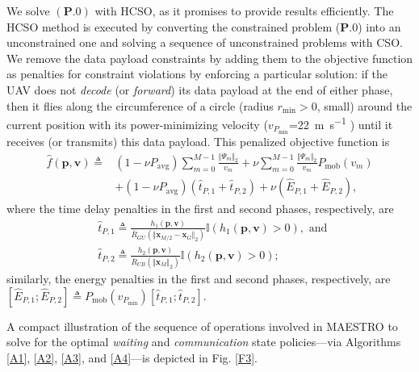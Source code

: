 \documentclass[12pt, draftcls, onecolumn]{IEEEtran}
\theoremstyle{plain}
\theoremstyle{definition}
\theoremstyle{remark}
\begin{document}
We solve $(\mathbf{P.0})$ with HCSO, as it promises to provide results efficiently. The HCSO method is executed by converting the constrained problem ($\mathbf{P.0}$) into an unconstrained one and solving a sequence of unconstrained problems with CSO. We remove the data payload constraints by adding them to the objective function as penalties for constraint violations by enforcing a particular solution: if the UAV does not \emph{decode} (or \emph{forward}) its data payload at the end of either phase, then it flies along the circumference of a circle (radius $r_{\mathrm{min}}{>}0$, small) around the current position with its power-minimizing velocity ($v_{P_{\mathrm{min}}}$=\qty[mode=text]{22}{\meter\per\second} \cite{SCA}) until it receives (or transmits) this data payload. This penalized objective function is
\begin{align}\label{eq:Fhat}
    \hat{f}(\mathbf{p},\mathbf v) \triangleq &(1-\nu P_{\mathrm{avg}}) \sum_{m=0}^{M-1} \frac{\Vert \Psi_m \Vert_2}{v_m} + \nu \sum_{m=0}^{M-1} \frac{\Vert \Psi_m \Vert_2}{v_m} P_{\mathrm{mob}}(v_m) \\
    &+ (1-\nu P_{\mathrm{avg}})(\hat{t}_{P,1} + \hat{t}_{P,2}) + \nu(\hat{E}_{P,1} + \hat{E}_{P,2})\nonumber,
\end{align}
where the time delay penalties in the first and second phases, respectively, are
\begin{align}
    &\hat{t}_{P,1} \triangleq \frac{h_{1}(\mathbf p,\mathbf v)}{\bar R_{GU}\left(\Vert\mathbf x_{M/2}-\mathbf x_{G}\Vert_2 \right)} \mathbb{I}\left( h_1 (\mathbf{p},\mathbf v) > 0 \right),\text{ and }\label{eq:THat1} \\
    & \hat{t}_{P,2} \triangleq \frac{h_{2}(\mathbf p,\mathbf v)}{\bar R_{UB}\left(\Vert\mathbf x_{M}\Vert_2\right)} \mathbb{I} (h_2 (\mathbf p,\mathbf v) > 0); \label{eq:THat2}
\end{align}
similarly, the energy penalties in the first and second phases, respectively, are $[\hat{E}_{P,1};\hat{E}_{P,2}] \triangleq P_{\mathrm{mob}}(v_{P_{\mathrm{min}}})[\hat{t}_{P,1};\hat{t}_{P,2}]$. 

A compact illustration of the sequence of operations involved in MAESTRO to solve for the optimal \emph{waiting} and \emph{communication} state policies---via Algorithms \ref{A1}, \ref{A2}, \ref{A3}, and \ref{A4}---is depicted in Fig. \ref{F3}.
\end{document}
